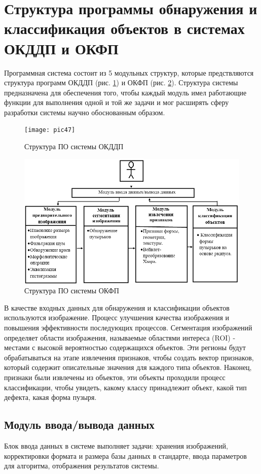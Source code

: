 \documentclass[a4paper,14pt]{extreport}
\begin{document}
\section{Структура программы обнаружения и классификация объектов в системах ОКДДП и ОКФП}
Программная система состоит из 5 модульных структур, которые предствляются структура программ ОКДДП (рис. \ref{pic47}) и ОКФП (рис. \ref{pic59}). Структура системы предназначена для обеспечения того, чтобы каждый модуль имел работающие функции для выполнения одной и той же задачи и мог расширять сферу разработки системы научно обоснованным образом.

\begin{figure}[ht!]
\centering
\texttt{[image: pic47]}
\caption{Структура ПО системы ОКДДП}
	\label{pic47}
		\end{figure} 
		
\begin{figure}[ht!]
\centering
\vspace{-0.8em}
\includegraphics [width=0.8\linewidth]{images/pic59.png}
\caption{Структура ПО системы ОКФП} \label{pic59}
\end{figure}
В качестве входных данных для обнаружения и классификации объектов используются изображение. Процесс улучшения качества изображения и повышения эффективности последующих процессов. Сегментация изображений определяет области изображения, называемые областями интереса (ROI) - местами с высокой вероятностью содержащихся объектов. Эти регионы будут обрабатываться на этапе извлечения признаков, чтобы создать вектор признаков, который содержит описательные значения для каждого типа объектов. Наконец,  признаки были извлечены из объектов, эти объекты проходили процесс классификации, чтобы увидеть, какому классу принадлежит объект, какой тип дефекта, какая форма пузыря.
\subsection{Модуль ввода/вывода данных}
Блок ввода данных в системе выполняет задачи: хранения изображений, корректировки формата и размера базы данных в стандарте, ввода параметров для алгоритма, отображения результатов системы.
\end{document}
